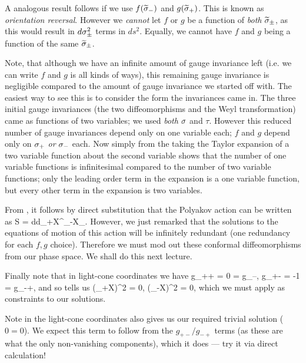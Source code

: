 \br 
    A analogous result follows if we use $f(\widetilde{\sigma}_-)$ and $g(\widetilde{\sigma}_+)$. This is known as \textit{orientation reversal}. However we \textit{cannot} let $f$ or $g$ be a function of \textit{both} $\widetilde{\sigma}_{\pm}$, as this would result in $d\sigma_{\pm}^2$ terms in $ds^2$. Equally, we cannot have $f$ and $g$ being a function of the same $\widetilde{\sigma}_{\pm}$.
\er 

\br 
    Note, that although we have an infinite amount of gauge invariance left (i.e. we can write $f$ and $g$ is all kinds of ways), this remaining gauge invariance is negligible compared to the amount of gauge invariance we started off with. The easiest way to see this is to consider the form the invariances came in. The three initial gauge invariances (the two diffeomorphisms and the Weyl transformation) came as functions of two variables; we used \textit{both} $\sigma$ and $\tau$. However this reduced number of gauge invariances depend only on one variable each; $f$ and $g$ depend only on $\sigma_+$ \textit{or} $\sigma_-$ each. Now simply from the taking the Taylor expansion of a two variable function about the second variable shows that the number of one variable functions is infinitesimal compared to the number of two variable functions; only the leading order term in the expansion is a one variable function, but every other term in the expansion is two variables. 
\er 

From , it follows by direct substitution that the Polyakov action can be written as 
\be
\label{eqn:PolyakovActionLightcone}
    S = \int d\sig d\tau \p_+X^{\mu}\p_-X_{\mu}.
\ee 
However, we just remarked that the solutions to the equations of motion of this action will be infinitely redundant (one redundancy for each $f,g$ choice). Therefore we must mod out these conformal diffeomorphisms from our phase space. We shall do this next lecture.

Finally note that in light-cone coordinates we have
\bse 
    g_{++} = 0 = g_{--}, \qquad g_{+-} = -1 = g_{-+},
\ese 
and so  tells us 
\be 
\label{eqn:PolyakovConstrainsLightcone}
    (\p_+X)^2  = 0, \qquad {} \qquad (\p_-X)^2  = 0,
\ee 
which we must apply as constraints to our solutions. 

\br 
    Note  in the light-cone coordinates also gives us our required trivial solution ($0=0$). We expect this term to follow from the $g_{+-}/g_{-+}$ terms (as these are what the only non-vanishing components), which it does --- try it via direct calculation!
\er 

